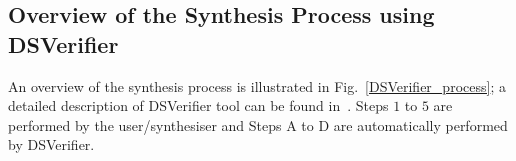 \documentclass{sig-alternate-05-2015}
\newcommand{\red}[1]{{\color{red}#1}}
\begin{document}
 






\subsection{Overview of the Synthesis Process using DSVerifier}
\label{verification-flow}


An overview of the synthesis process is illustrated in
Fig.~\ref{DSVerifier_process}; a detailed description of DSVerifier tool can
be found in~\cite{IsmailBCFF15}.  Steps $1$ to $5$ are performed by the
user/synthesiser and Steps A to D are automatically performed by DSVerifier.
%
\end{document}
